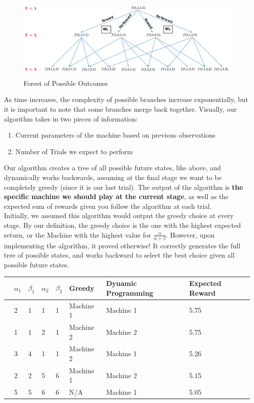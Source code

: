 \documentclass{article}
\begin{document}
\begin{figure}[H]
\centering
\includegraphics[scale=0.75]{Dynamic_Programming_Tree.png}
\caption{Forest of Possible Outcomes}
\end{figure}

As time increases, the complexity of possible branches increase exponentially, but it is important to note that some branches merge back together. Visually, our algorithm takes in two pieces of information:

\begin{enumerate}
\item Current parameters of the machine based on previous observations
\item Number of Trials we expect to perform
\end{enumerate}

Our algorithm creates a tree of all possible future states, like above, and dynamically works backwards, assuming at the final stage we want to be completely greedy (since it is our last trial). The output of the algorithm is \textbf{the specific machine we should play at the current stage}, as well as the expected sum of rewards given you follow the algorithm at each trial.\\

Initially, we assumed this algorithm would output the greedy choice at every stage. By our definition, the greedy choice is the one with the highest expected return, or the Machine with the highest value for $\frac{\alpha}{\alpha + \beta}$. However, upon implementing the algorithm, it proved otherwise! It correctly generates the full tree of possible states, and works backward to select the best choice given all possible future states.

\begin{table}[ht]
\centering
\begin{tabular}{rlllllll}
  \hline
 & $\alpha_1$ & $\beta_1$ & $\alpha_2$ & $\beta_2$ & Greedy & Dynamic Programming & Expected Reward \\ 
  \hline
   & 2 & 1 & 1 & 1 & Machine 1 & Machine 1 & 5.75 \\ 
   & 1 & 1 & 2 & 1 & Machine 2 & Machine 2 & 5.75 \\ 
   & 3 & 4 & 1 & 1 & Machine 2 & Machine 1 & 5.26 \\ 
   & 2 & 2 & 5 & 6 & Machine 1 & Machine 2 & 5.15 \\ 
   & 5 & 5 & 6 & 6 & N/A & Machine 1 & 5.05 \\ 
   \hline
\end{tabular}
\end{table}
\end{document}
